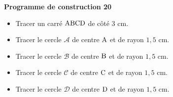 \documentclass[exercice,a4]{thedocument}%
\begin{document}
%
\noindent\textbf{Programme de construction 20}\par\smallskip\noindent
\begin{itemize}
    \item Tracer un carré $\text{ABCD}$ de côté $3\text{ cm}$.
    \item Tracer le cercle $\mathcal{A}$ de centre $\text{A}$ et de
    rayon $1{,}5\text{ cm}$.
    \item Tracer le cercle $\mathcal{B}$ de centre $\text{B}$ et de
    rayon $1{,}5\text{ cm}$.
    \item Tracer le cercle $\mathcal{C}$ de centre $\text{C}$ et de
    rayon $1{,}5\text{ cm}$.
    \item Tracer le cercle $\mathcal{D}$ de centre $\text{D}$ et de
    rayon $1{,}5\text{ cm}$.
\end{itemize}
\end{document}
